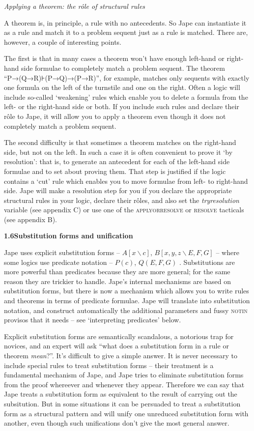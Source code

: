 \documentclass[11pt]{book}
\newcommand{\tab}{\hspace{5mm}}
\begin{document}
\textit{Applying a theorem: the r\^{o}le of structural rules}


A theorem is, in principle, a rule with no antecedents. So Jape can instantiate it as a rule and match it to a problem sequent just as a rule is matched. There are, however, a couple of interesting points.


The first is that in many cases a theorem won't have enough left-hand or right-hand side formulae to completely match a problem sequent. The theorem ``P→(Q→R){\nobreakspace}⊦{\nobreakspace}(P→Q)→(P→R)'', for example, matches only sequents with exactly one formula on the left of the turnstile and one on the right. Often a logic will include so-called `weakening' rules which enable you to delete a formula from the left- or the right-hand side or both. If you include such rules and declare their r\^{o}le to Jape, it will allow you to apply a theorem even though it does not completely match a problem sequent.


The second difficulty is that sometimes a theorem matches on the right-hand side, but not on the left. In such a case it is often convenient to prove it `by resolution': that is, to generate an antecedent for each of the left-hand side formulae and to set about proving them. That step is justified if the logic contains a `cut' rule which enables you to move formulae from left- to right-hand side. Jape will make a resolution step for you if you declare the appropriate structural rules in your logic, declare their r\^{o}les, and also set the \textit{tryresolution} variable (see appendix C) or use one of the \textsc{applyorresolve} or \textsc{resolve} tacticals (see appendix B).


\textbf{{\large 1.6\tab Substitution forms and unification}}


Jape uses explicit substitution forms -- $A[x\backslash c]$, $B[x,y,z\backslash E,F,G]$ -- where some logics use predicate notation -- $P(c)$, $Q(E,F,G)$ . Substitutions are more powerful than predicates because they are more general; for the same reason they are trickier to handle. Jape's internal mechanisms are based on substitution forms, but there is now a mechanism which allows you to write rules and theorems in terms of predicate formulae. Jape will translate into substitution notation, and construct automatically the additional parameters and fussy \textsc{notin} provisos that it needs -- see `interpreting predicates' below.


Explicit substitution forms are semantically scandalous, a notorious trap for novices, and an expert will ask ``what does a substitution form in a rule or theorem \textit{mean}?''. It's difficult to give a simple answer. It is never necessary to include special rules to treat substitution forms -- their treatment is a fundamental mechanism of Jape, and Jape tries to eliminate substitution forms from the proof whereever and whenever they appear. Therefore we can say that Jape treats a substitution form as equivalent to the result of carrying out the subsitution. But in some situations it can be persuaded to treat a substitution form as a structural pattern and will unify one unreduced substitution form with another, even though such unifications don't give the most general answer.
\end{document}
